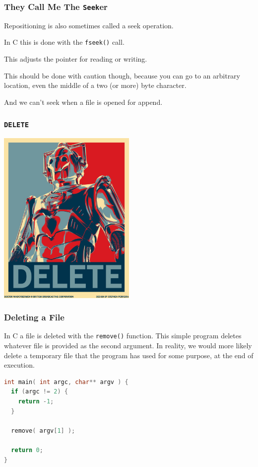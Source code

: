 \begin{frame}
\frametitle{They Call Me The \texttt{Seek}er}

Repositioning is also sometimes called a seek operation.

In C this is done with the \texttt{fseek()} call. 

This adjusts the pointer for reading or writing. 

This should be done with caution though, because you can go to an arbitrary location, even the middle of a two (or more) byte character. 

And we can't seek when a file is opened for append.

\end{frame}


\begin{frame}
\frametitle{\texttt{DELETE}}

\begin{center}
\includegraphics[width=0.5\textwidth]{images/delete.png}
\end{center}

\end{frame}


\begin{frame}[fragile]
\frametitle{Deleting a File}

In C a file is deleted with the \texttt{remove()} function. This simple program deletes whatever file is provided as the second argument. In reality, we would more likely delete a temporary file that the program has used for some purpose, at the end of execution. 

\begin{lstlisting}[language=C]
int main( int argc, char** argv ) {
  if (argc != 2) {
    return -1;
  }
  
  remove( argv[1] );

  return 0;
}    
\end{lstlisting}

\end{frame}




